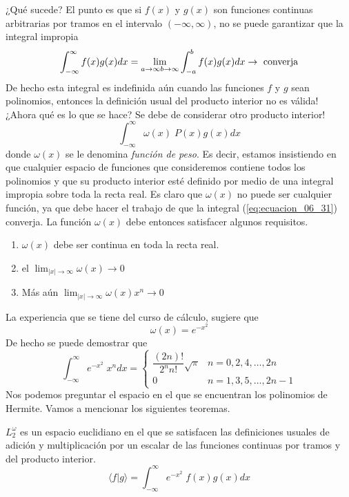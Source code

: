 ¿Qué sucede? El punto es que si $f(x)$ y $g(x)$ son funciones continuas arbitrarias por tramos en el intervalo $(-\infty, \infty)$, no se puede garantizar que la integral impropia
\begin{equation}
\int_{-\infty}^{\infty} f(x) g(x) dx = \lim_{a \to \infty \\ b \to \infty} \int_{-a}^{b} f(x)g(x) dx \rightarrow \text{ converja}
\label{eq:ecuacion_06_30}
\end{equation}
De hecho esta integral es indefinida aún cuando las funciones $f$ y $g$ sean polinomios, entonces la definición usual del producto interior no es válida!
\\
¿Ahora qué es lo que se hace? Se debe de considerar otro producto interior!
\begin{equation}
\int_{-\infty}^{\infty} \omega(x) \; P(x) g(x) dx
\label{eq:ecuacion_06_31}
\end{equation}
donde $\omega(x)$ se le denomina \emph{función de peso}. Es decir, estamos insistiendo en que cualquier espacio de funciones que consideremos contiene todos los polinomios y que su producto interior esté definido por medio de una integral impropia sobre toda la recta real. Es claro que $\omega (x)$ no puede ser cualquier función, ya que debe hacer el trabajo de que la integral (\ref{eq:ecuacion_06_31}) converja. La función $\omega (x)$ debe entonces satisfacer algunos requisitos.
\begin{enumerate}
\item $\omega(x)$ debe ser continua en toda la recta real.
\item el $\lim_{\vert x \vert \to \infty} \omega (x) \rightarrow 0$
\item Más aún $\lim_{\vert x \vert \to \infty} \omega (x) x^{n} \rightarrow 0$
\end{enumerate}
La experiencia que se tiene del curso de cálculo, sugiere que
\[  \omega(x) = e^{-x^{2}} \]
De hecho se puede demostrar que
\begin{equation}
\int_{-\infty}^{\infty} e^{-x^{2}} \; x^{n} d x = \begin{cases}
\dfrac{(2n)!}{2^{n}n!} \sqrt{\pi} & n = 0,2, 4, \ldots, 2n \\
0 & n = 1, 3, 5, \ldots, 2n - 1 \end{cases}
\label{eq:ecuacion_06_32}
\end{equation}
Nos podemos preguntar el espacio en el que se encuentran los polinomios de Hermite. Vamos a mencionar los siguientes teoremas.
\begin{teorema}
$L_{2}^{\omega}$ es un espacio euclidiano en el que se satisfacen las definiciones usuales de adición y multiplicación por un escalar de las funciones continuas por tramos y del producto interior.
\begin{equation}
\langle f \vert g \rangle = \int_{-\infty}^{\infty} e^{-x^{2}} \; f(x)g(x) dx
\label{eq:ecuacion_06_33}
\end{equation}
\end{teorema}
